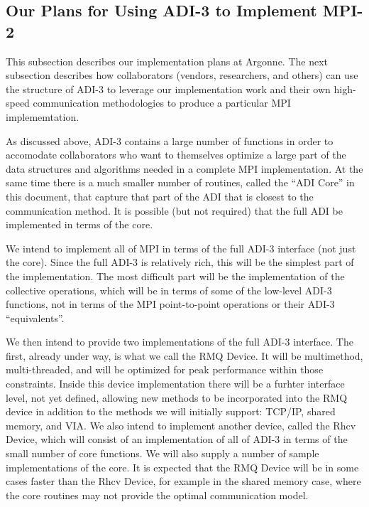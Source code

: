 \documentclass{article}
\begin{document}
\subsection{Our Plans for Using ADI-3 to Implement MPI-2}
\label{sec:plans}

%
%
This subsection describes our implementation plans at Argonne.  The next
subsection describes how collaborators (vendors, researchers, and others) can
use the structure of ADI-3 to leverage our implementation work and their own
high-speed communication methodologies to produce a particular MPI
implememtation.

As discussed above, ADI-3 contains a large number of functions in order to
accomodate collaborators who want to themselves optimize a large part of the
data structures and algorithms needed in a complete MPI implementation.  At the
same time there is a much smaller number of routines, called the ``ADI Core''
in this document, that capture that part of the ADI that is closest to the
communication method. It is possible (but not required) that the full ADI be
implemented in terms of the core.

We intend to implement all of MPI in terms of the full ADI-3 interface (not
just the core).  Since the full ADI-3 is relatively rich, this will be the
simplest part of the implementation.  The most difficult part will be the
implementation of the collective operations, which will be in terms of some of
the low-level ADI-3 functions, not in terms of the MPI point-to-point
operations or their ADI-3 ``equivalents''.

We then intend to provide two implementations of the full ADI-3 interface.
The first, already under way, is what we call the RMQ Device.  It will be 
multimethod, multi-threaded, and will be optimized for peak performance within
those constraints.  Inside this device implementation there will be a furhter
interface level, not yet defined, allowing new methods to be incorporated into
the RMQ device in addition to the methods we will initially support:  TCP/IP,
shared memory, and VIA.  We also intend to implement another device, called 
the Rhcv Device, which will consist of an implementation of all of ADI-3 in
terms of the small number of core functions.  We will also supply a number of
sample implementations of the core.  It is expected that the RMQ Device will
be in some cases faster than the Rhcv Device, for example in the shared
memory case, where the core routines may not provide the optimal communication
model. 
\end{document}
